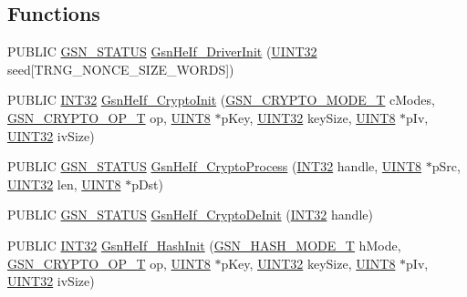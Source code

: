 \subsection*{Functions}
\begin{DoxyCompactItemize}
\item 
PUBLIC \hyperlink{a00660_gada5951904ac6110b1fa95e51a9ddc217}{GSN\_\-STATUS} \hyperlink{a00515_a614612ab6385203620ae02c109ba81e2}{GsnHeIf\_\-DriverInit} (\hyperlink{a00660_gae1e6edbbc26d6fbc71a90190d0266018}{UINT32} seed\mbox{[}TRNG\_\-NONCE\_\-SIZE\_\-WORDS\mbox{]})
\item 
PUBLIC \hyperlink{a00660_ga63021d67d54286c2163bcdb43a6f2569}{INT32} \hyperlink{a00515_a753f5c9638475251276c863916b39f9e}{GsnHeIf\_\-CryptoInit} (\hyperlink{a00515_ab9bcbd29c0f7622f387e4b527acef326}{GSN\_\-CRYPTO\_\-MODE\_\-T} cModes, \hyperlink{a00515_aee4f8acfc5b53a56d0710713c26a5fd6}{GSN\_\-CRYPTO\_\-OP\_\-T} op, \hyperlink{a00660_gab27e9918b538ce9d8ca692479b375b6a}{UINT8} $\ast$pKey, \hyperlink{a00660_gae1e6edbbc26d6fbc71a90190d0266018}{UINT32} keySize, \hyperlink{a00660_gab27e9918b538ce9d8ca692479b375b6a}{UINT8} $\ast$pIv, \hyperlink{a00660_gae1e6edbbc26d6fbc71a90190d0266018}{UINT32} ivSize)
\item 
PUBLIC \hyperlink{a00660_gada5951904ac6110b1fa95e51a9ddc217}{GSN\_\-STATUS} \hyperlink{a00515_aa2d5e199d4c4268266b9275ac76dd7c7}{GsnHeIf\_\-CryptoProcess} (\hyperlink{a00660_ga63021d67d54286c2163bcdb43a6f2569}{INT32} handle, \hyperlink{a00660_gab27e9918b538ce9d8ca692479b375b6a}{UINT8} $\ast$pSrc, \hyperlink{a00660_gae1e6edbbc26d6fbc71a90190d0266018}{UINT32} len, \hyperlink{a00660_gab27e9918b538ce9d8ca692479b375b6a}{UINT8} $\ast$pDst)
\item 
PUBLIC \hyperlink{a00660_gada5951904ac6110b1fa95e51a9ddc217}{GSN\_\-STATUS} \hyperlink{a00515_aa50658eebede268579c8e426d648ba38}{GsnHeIf\_\-CryptoDeInit} (\hyperlink{a00660_ga63021d67d54286c2163bcdb43a6f2569}{INT32} handle)
\item 
PUBLIC \hyperlink{a00660_ga63021d67d54286c2163bcdb43a6f2569}{INT32} \hyperlink{a00515_a541d5261ef4b436f3deb2f75afe15968}{GsnHeIf\_\-HashInit} (\hyperlink{a00515_afadc6098eee5910bf340f390d3e0b9f3}{GSN\_\-HASH\_\-MODE\_\-T} hMode, \hyperlink{a00515_aee4f8acfc5b53a56d0710713c26a5fd6}{GSN\_\-CRYPTO\_\-OP\_\-T} op, \hyperlink{a00660_gab27e9918b538ce9d8ca692479b375b6a}{UINT8} $\ast$pKey, \hyperlink{a00660_gae1e6edbbc26d6fbc71a90190d0266018}{UINT32} keySize, \hyperlink{a00660_gab27e9918b538ce9d8ca692479b375b6a}{UINT8} $\ast$pIv, \hyperlink{a00660_gae1e6edbbc26d6fbc71a90190d0266018}{UINT32} ivSize)

\end{DoxyCompactItemize}
